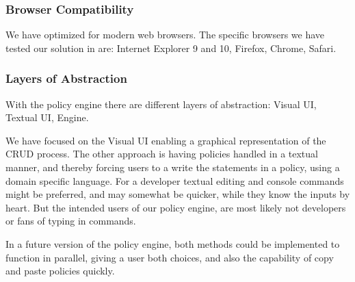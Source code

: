 \subsubsection{Browser Compatibility}
We have optimized for modern web browsers. The specific browsers we have tested our solution in are: Internet Explorer 9 and 10, Firefox, Chrome, Safari. 

\subsubsection{Layers of Abstraction}
With the policy engine there are different layers of abstraction: Visual UI, Textual UI, Engine.

We have focused on the Visual UI enabling a graphical representation of the CRUD process. The other approach is having policies handled in a textual manner, and thereby forcing users to a write the statements in a policy, using a domain specific language. For a developer textual editing and console commands might be preferred, and may somewhat be quicker, while they know the inputs by heart. But the intended users of our policy engine, are most likely not developers or fans of typing in commands.

In a future version of the policy engine, both methods could be implemented to function in parallel, giving a user both choices, and also the capability of copy and paste policies quickly.